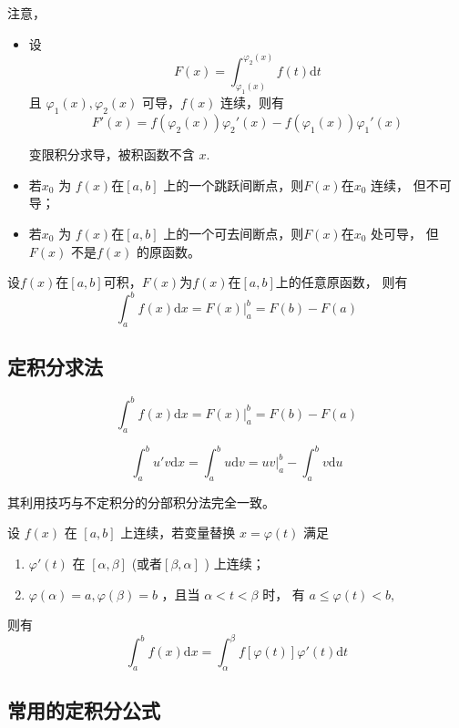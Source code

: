 注意，\begin{itemize}
    \item 设 $$
        F(x)=\int_{\varphi_1(x)}^{\varphi_2(x)} f(t)\mathrm{d}t
    $$ 且 $ \varphi_1(x),\varphi_2(x) $ 可导，$ f(x) $ 连续，则有$$
        F'(x) = f(\varphi_2(x))\varphi_2'(x)-f(\varphi_1(x))\varphi_1'(x)
    $$ 

    变限积分求导，被积函数不含 $ x. $ 
    \item 若$ x_0 $ 为 $ f(x) $在$ [a,b] $ 上的一个跳跃间断点，则$ F(x) $在$ x_0 $ 连续，
    但不可导；
    \item 若$ x_0 $ 为 $ f(x) $在$ [a,b] $ 上的一个可去间断点，则$ F(x) $在$ x_0 $ 处可导，
    但 $ F(x) $ 不是$ f(x) $ 的原函数。
\end{itemize}

\begin{Theo}[牛顿——莱布尼茨公式]

    设$ f(x) $在$ [a,b] $可积，$ F(x) $为$ f(x) $在$ [a,b] $上的任意原函数，
    则有$$
        \int_a^b f(x)\mathrm{d}x=F(x)\Big|_a^b=F(b)-F(a)
    $$ 
\end{Theo}

\subsection{定积分求法}


$$
   \int_a^b f(x)\mathrm{d}x=F(x)\Big|_a^b=F(b)-F(a)
$$ 


$$
    \int_a^b u'v \mathrm{d}x = \int_a^b u\mathrm{d}v = uv\Big|_a^b - \int_a^b v\mathrm{d}u
$$ 

其利用技巧与不定积分的分部积分法完全一致。


设 $ f(x) $ 在 $ [a,b] $ 上连续，若变量替换 $ x=\varphi(t) $ 满足
\begin{enumerate}
    \item $ \varphi'(t) $ 在 $ [\alpha,\beta] $ (或者$ [\beta,\alpha] $ ) 上连续；
    \item $ \varphi(\alpha) = a , \varphi(\beta) = b $ ，且当 $ \alpha < t < \beta $ 时，
    有 $ a \leq \varphi(t) < b, $ 
\end{enumerate}
则有$$
    \int_a^b f(x)\mathrm{d}x = \int_\alpha^\beta f[\varphi(t)]\varphi'(t)\mathrm{d}t
$$ 

\subsection{常用的定积分公式}

